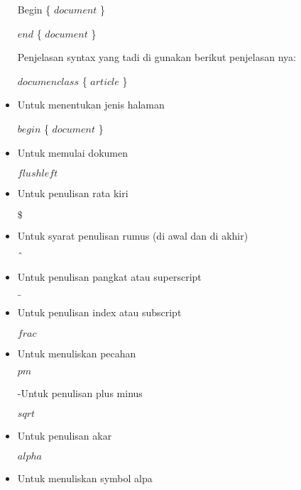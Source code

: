 \begin{itemize}
Begin \{ $document$ \} \par

$end$ \{ $document$ \} \par

Penjelasan syntax yang tadi di gunakan berikut penjelasan nya:\par

$documenclass$ \{ $article$ \} \par

	\item Untuk menentukan jenis halaman\par

$begin$ \{ $document$ \} \par

	\item Untuk memulai dokumen\par

$flushleft$\par

	\item Untuk penulisan rata kiri\par

$\$$\par

	\item Untuk syarat penulisan rumus (di awal dan di akhir)\par

$ \string^ $\par

	\item Untuk penulisan pangkat atau superscript\par

$ \_ $\par

	\item Untuk penulisan index atau subscript\par

$frac$\par

	\item Untuk menuliskan pecahan\par

$pm$\par

-Untuk penulisan plus minus\par

$sqrt$\par

	\item Untuk penulisan akar\par

$alpha$\par

	\item Untuk menuliskan symbol alpa
\end{itemize}\par

